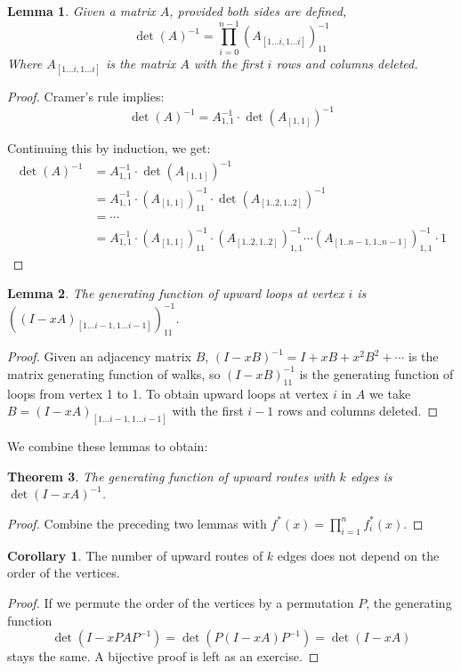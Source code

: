 \documentclass[a4paper, 11pt]{article}
\newtheorem{theorem}{Theorem}[section]
\newtheorem{lemma}[theorem]{Lemma}
\theoremstyle{definition}
\newtheorem{corollary}{Corollary}[theorem]
\begin{document}
\begin{lemma} Given a matrix $A$, provided both sides are defined,
  \[ \det(A)^{-1} = \prod_{i=0}^{n-1} (A_{[1\dots i, 1\dots i]})^{-1}_{11} \]
Where $A_{[1\dots i, 1\dots i]}$ is the matrix $A$ with the first $i$ rows and columns deleted.
\end{lemma}
\begin{proof}
  Cramer's rule implies:
\[
  \det(A)^{-1} = A^{-1}_{1,1} \cdot \det(A_{[1,1]})^{-1}
\]

Continuing this by induction, we get:
\begin{align*}
  \det(A)^{-1} &= A^{-1}_{1,1} \cdot \det(A_{[1,1]})^{-1} \\
    &= A^{-1}_{1,1} \cdot (A_{[1,1]})^{-1}_{11} \cdot \det(A_{[1..2,1..2]})^{-1} \\
    &= \cdots \\
    &= A^{-1}_{1,1} \cdot (A_{[1,1]})^{-1}_{11} \cdot (A_{[1..2,1..2]})^{-1}_{1,1} \cdots
        (A_{[1..n-1,1..n-1]})^{-1}_{1,1} \cdot 1
\end{align*}
\end{proof}

\begin{lemma}
  The generating function of upward loops at vertex $i$ is $((I - xA)_{[1\dots i-1, 1\dots i-1]})^{-1}_{11}$.
\end{lemma}
\begin{proof}
  Given an adjacency matrix $B$, $(I - xB)^{-1} = I + xB + x^2 B^2 + \cdots$ is the matrix generating function of walks, so $(I - xB)^{-1}_{11}$ is the generating function of loops from vertex 1 to 1. To obtain upward loops at vertex $i$ in $A$ we take $B = (I - xA)_{[1\dots i-1, 1\dots i-1]}$ with the first $i-1$ rows and columns deleted.
\end{proof}

We combine these lemmas to obtain:

\begin{theorem}
  The generating function of upward routes with $k$ edges is $\det(I - xA)^{-1}$.
\end{theorem}
\begin{proof}
  Combine the preceding two lemmas with $f^{*}(x) = \prod_{i=1}^n f^{*}_i(x)$.
\end{proof}

\begin{corollary}
  The number of upward routes of $k$ edges does not depend on the order of the vertices.
\end{corollary}
\begin{proof}
  If we permute the order of the vertices by a permutation $P$, the generating function
  \[
    \det(I - xPAP^{-1}) = \det(P(I - xA)P^{-1}) = \det(I - xA)
  \] stays the same. A bijective proof is left as an exercise.
\end{proof}
\end{document}
